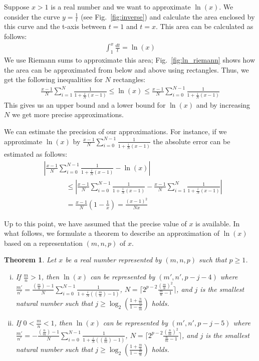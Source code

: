 \documentclass{article}
\newtheorem{mytheorem}{Theorem}
\numberwithin{mytheorem}{section}
\newcommand{\lnsumu}[2] {\frac{#1-1}{#2} \sum_{i=0}^{#2-1}\frac{1}{1+\frac{i}{#2}(#1-1)}}
\newcommand{\lnsuml}[2] {\frac{#1-1}{#2} \sum_{i=1}^{#2}\frac{1}{1+\frac{i}{#2}(#1-1)}}
\begin{document}
Suppose $x>1$ is a real number and we want to approximate $\ln(x)$. We consider the curve $y=\frac{1}{t}$ (see Fig.~\ref{fig:inverse}) and calculate the area enclosed by this curve and the t-axis between $t=1$ and $t=x$. This area can be calculated as follows:
\begin{align*}
\int_1^{x} \frac{dt}{t}=\ln(x)
\end{align*} 
We use Riemann sums to approximate this area; Fig.~\ref{fig:ln_riemann} shows how the area can be approximated from below and above using rectangles. Thus, we get the following inequalities for $N$ rectangles:
\begin{align*}
\lnsuml{x}{N} \leq \ln(x) \leq \lnsumu{x}{N}  
\end{align*}  
This gives us an upper bound and a lower bound for $\ln(x)$ and by increasing $N$ we get more precise approximations. 

We can estimate the precision of our approximations. For instance, if we approximate $\ln(x)$ by $\lnsumu{x}{N}$ the absolute error can be estimated as follows:
\begin{align}
&|\lnsumu{x}{N}-\ln(x)|\nonumber\\
&\phantom{\frac{x-1}{N}\sum}\leq|\lnsumu{x}{N}-\lnsuml{x}{N}|\nonumber\\
&\phantom{\frac{x-1}{N}\sum}= \frac{x-1}{N}(1-\frac{1}{x})=\frac{(x-1)^2}{Nx}\label{eqn:ln_riemann_prec}
\end{align}

Up to this point, we have assumed that the precise value of $x$ is available. In what follows, we formulate a theorem to describe an approximation of $\ln(x)$ based on a representation $(m,n,p)$ of $x$. 
\begin{mytheorem}\label{thm:ln}
Let $x$ be a real number represented by $(m,n,p)$ such that $p\geq 1$.
\begin{enumerate}[i.]
\item
If $\frac{m}{n}>1$, then $\ln(x)$ can be represented by $(m',n',p-j-4)$ where $\frac{m'}{n'}=\lnsumu{(\frac{m}{n})}{N}$, $N=\lceil 2^{p-2}\frac{(\frac{m}{n})^2}{\frac{m}{n}-1}\rceil$, and $j$ is the smallest natural number such that $j\geq \log_2(\frac{1+\frac{n}{m}}{1-\frac{n}{m}})$ holds. 
\item
If $0<\frac{m}{n}<1$, then $\ln(x)$ can be represented by $(m',n',p-j-5)$ where $\frac{m'}{n'}=-\lnsumu{(\frac{n}{m})}{N}$, $N=\lceil 2^{p-2}\frac{(\frac{n}{m})^2}{\frac{n}{m}-1}\rceil$, and $j$ is the smallest natural number such that $j\geq \log_2(\frac{1+\frac{m}{n}}{1-\frac{m}{n}})$ holds. 
\end{enumerate}

\end{mytheorem}
\end{document}
